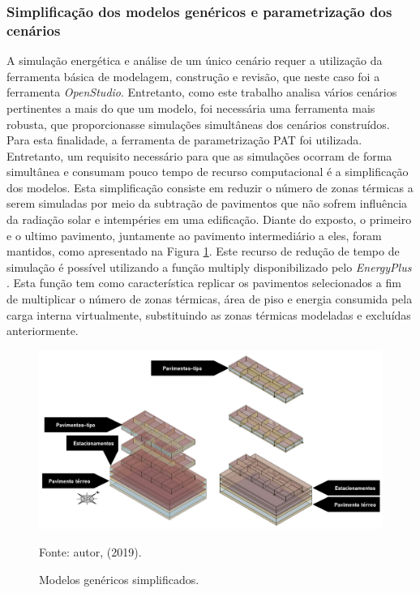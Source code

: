 \subsubsection{Simplificação dos modelos genéricos e parametrização dos cenários}
\noindent A simulação energética e análise de um único cenário requer a utilização da ferramenta básica de modelagem, construção e revisão, que neste caso foi a ferramenta \textit{OpenStudio}. Entretanto, como este trabalho analisa vários cenários pertinentes a mais do que um modelo, foi necessária uma ferramenta mais robusta, que proporcionasse simulações simultâneas dos cenários construídos. Para esta finalidade, a ferramenta de parametrização PAT foi utilizada.\vspace*{0.3cm} \newline
\noindent Entretanto, um requisito necessário para que as simulações ocorram de forma simultânea e consumam pouco tempo de recurso computacional é a simplificação dos modelos. Esta simplificação consiste em reduzir o número de zonas térmicas a serem simuladas por meio da subtração de pavimentos que não sofrem influência da radiação solar e intempéries em uma edificação.\vspace*{0.3cm} \newline
\noindent Diante do exposto, o primeiro e o ultimo pavimento, juntamente ao pavimento intermediário a eles, foram mantidos, como apresentado na Figura \ref{fig:figure20}. Este recurso de redução de tempo de simulação é possível utilizando a função multiply disponibilizado pelo \textit{EnergyPlus} \cite{U.S.DepartmentofEnergy-USDOE2019}. Esta função tem como característica replicar os pavimentos selecionados a fim de multiplicar o número de zonas térmicas, área de piso e energia consumida pela carga interna virtualmente, substituindo as zonas térmicas modeladas e excluídas anteriormente.\newline
\begin{figure}[H]
    \caption{Modelos genéricos simplificados.}
    \includegraphics[width=1.0\textwidth]{figures/fig20-modelos.png}
    \begin{flushleft}
        \par \small Fonte: autor, (2019).
    \end{flushleft}
    \label{fig:figure20}
\end{figure}
